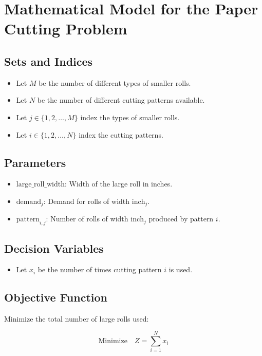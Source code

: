 \documentclass{article}
\begin{document}
\section*{Mathematical Model for the Paper Cutting Problem}

\subsection*{Sets and Indices}
\begin{itemize}
    \item Let \( M \) be the number of different types of smaller rolls.
    \item Let \( N \) be the number of different cutting patterns available.
    \item Let \( j \in \{1, 2, \ldots, M\} \) index the types of smaller rolls.
    \item Let \( i \in \{1, 2, \ldots, N\} \) index the cutting patterns.
\end{itemize}

\subsection*{Parameters}
\begin{itemize}
    \item \( \text{large\_roll\_width} \): Width of the large roll in inches.
    \item \( \text{demand}_j \): Demand for rolls of width \( \text{inch}_j \).
    \item \( \text{pattern}_{i,j} \): Number of rolls of width \( \text{inch}_j \) produced by pattern \( i \).
\end{itemize}

\subsection*{Decision Variables}
\begin{itemize}
    \item Let \( x_i \) be the number of times cutting pattern \( i \) is used.
\end{itemize}

\subsection*{Objective Function}
Minimize the total number of large rolls used:

\[
\text{Minimize} \quad Z = \sum_{i=1}^{N} x_i
\]
\end{document}

